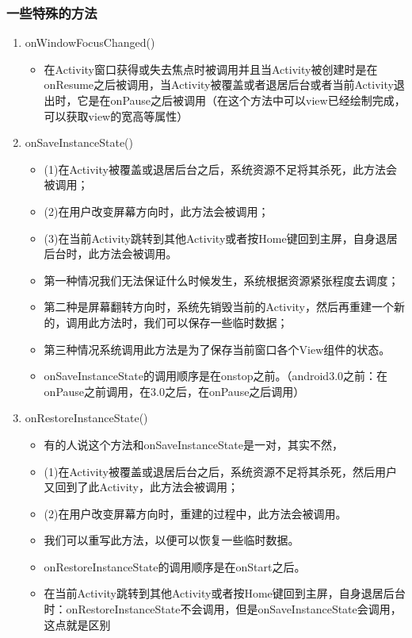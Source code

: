 \documentclass[9pt, b5paper]{article}
\begin{document}
\subsubsection{一些特殊的方法}
\label{sec-1-1-4}
\begin{enumerate}
\item onWindowFocusChanged()
\label{sec-1-1-4-1}
\begin{itemize}
\item 在Activity窗口获得或失去焦点时被调用并且当Activity被创建时是在onResume之后被调用，当Activity被覆盖或者退居后台或者当前Activity退出时，它是在onPause之后被调用（在这个方法中可以view已经绘制完成，可以获取view的宽高等属性）
\end{itemize}
\item onSaveInstanceState()
\label{sec-1-1-4-2}
\begin{itemize}
\item (1)在Activity被覆盖或退居后台之后，系统资源不足将其杀死，此方法会被调用；
\item (2)在用户改变屏幕方向时，此方法会被调用；
\item (3)在当前Activity跳转到其他Activity或者按Home键回到主屏，自身退居后台时，此方法会被调用。
\item 第一种情况我们无法保证什么时候发生，系统根据资源紧张程度去调度；
\item 第二种是屏幕翻转方向时，系统先销毁当前的Activity，然后再重建一个新的，调用此方法时，我们可以保存一些临时数据；
\item 第三种情况系统调用此方法是为了保存当前窗口各个View组件的状态。
\item onSaveInstanceState的调用顺序是在onstop之前。（android3.0之前：在onPause之前调用，在3.0之后，在onPause之后调用）
\end{itemize}
\item onRestoreInstanceState()
\label{sec-1-1-4-3}
\begin{itemize}
\item 有的人说这个方法和onSaveInstanceState是一对，其实不然，
\item (1)在Activity被覆盖或退居后台之后，系统资源不足将其杀死，然后用户又回到了此Activity，此方法会被调用；
\item (2)在用户改变屏幕方向时，重建的过程中，此方法会被调用。
\item 我们可以重写此方法，以便可以恢复一些临时数据。
\item onRestoreInstanceState的调用顺序是在onStart之后。
\item 在当前Activity跳转到其他Activity或者按Home键回到主屏，自身退居后台时：onRestoreInstanceState不会调用，但是onSaveInstanceState会调用，这点就是区别
\end{itemize}
\end{enumerate}
\end{document}
